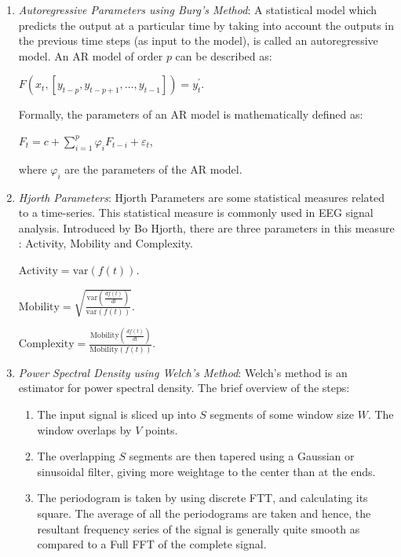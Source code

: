\begin{enumerate}
\item \emph{Autoregressive Parameters using Burg's Method}: A statistical model which predicts the output at a particular time by taking into account the outputs in the previous time steps (as input to the model), is called an autoregressive model. An AR model of order $p$ can be described as:
\begin{tightcenter}
$F(x_t, [y_{t - p}, y_{t - p + 1}, \ldots, y_{t - 1}]) = y_{t}^{\prime}$.
\end{tightcenter}
Formally, the parameters of an AR model is mathematically defined as:
\begin{tightcenter}
${F_{t}=c+\sum _{{i=1}}^{p}\varphi _{i}F_{{t-i}}+\varepsilon _{t}}$,
\end{tightcenter}
where $\varphi _{i}$ are the parameters of the AR model.
\item \emph{Hjorth Parameters}: Hjorth Parameters are some statistical measures related to a time-series. This statistical measure is commonly used in EEG signal analysis. Introduced by Bo Hjorth, there are three parameters in this measure : Activity, Mobility and Complexity.
\begin{tightcenter}
${\displaystyle {\text{Activity}}={\text{var}}(f(t)).}$
\end{tightcenter}
\begin{tightcenter}
${\displaystyle {\text{Mobility}}={\sqrt {\frac {{\text{var}}({\frac {df(t)}{dt}})}{{\text{var}}(f(t))}}}.}$
\end{tightcenter}
\begin{tightcenter}
${\displaystyle {\text{Complexity}}={\frac {{\text{Mobility}}({\frac {df(t)}{dt}})}{{\text{Mobility}}(f(t))}}.}$
\end{tightcenter}
\item \emph{Power Spectral Density using Welch's Method}: Welch's method is an estimator for power spectral density. The brief overview of the steps: 
\begin{enumerate}
    \item The input signal is sliced up into $S$ segments of some window size $W$. The window overlaps by $V$ points.
    \item The overlapping $S$ segments are then tapered using a Gaussian or sinusoidal filter, giving more weightage to the center than at the ends.
    \item The periodogram is taken by using discrete FTT, and calculating its square. The average of all the periodograms are taken and hence, the resultant frequency series of the signal is generally quite smooth as compared to a Full FFT of the complete signal.
\end{enumerate}


\end{enumerate}
